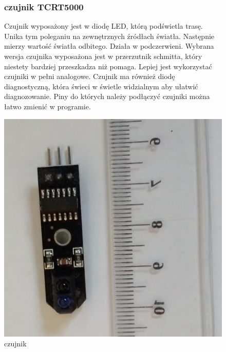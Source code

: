 \documentclass[a4paper,11pt]{article}
\def\SCALE{0.6}
\begin{document}
\begin{figure}[H]
	\subsubsection{czujnik TCRT5000}
	Czujnik wyposażony jest w diodę LED, którą podświetla trasę. Unika tym poleganiu na zewnętrznych źródłach światła. Następnie mierzy wartość światła odbitego. Działa w podczerwieni.
	Wybrana wersja czujnika wyposażona jest w przerzutnik schmitta, który niestety bardziej przeszkadza niż pomaga. Lepiej jest wykorzystać czujniki w pełni analogowe. Czujnik ma również diodę diagnostyczną, która świeci w świetle widzialnym aby ułatwić diagnozowanie.
	Piny do których należy podłączyć czujniki można łatwo zmienić w programie.

	\centering
	\includegraphics[width=\SCALE
	\paperwidth]{czujnik}
	\caption{czujnik}

\end{figure}
\end{document}
